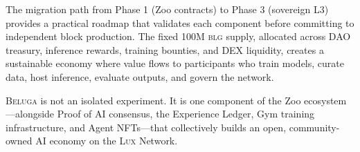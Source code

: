\documentclass[11pt,letterpaper]{article}
\newcommand{\Lux}{\textsc{Lux}}
\newcommand{\Beluga}{\textsc{Beluga}}
\newcommand{\BLG}{\textsc{blg}}
\begin{document}
The migration path from Phase 1 (Zoo contracts) to Phase 3 (sovereign L3) provides a practical roadmap that validates each component before committing to independent block production. The fixed 100M \BLG{} supply, allocated across DAO treasury, inference rewards, training bounties, and DEX liquidity, creates a sustainable economy where value flows to participants who train models, curate data, host inference, evaluate outputs, and govern the network.

\Beluga{} is not an isolated experiment. It is one component of the Zoo ecosystem---alongside Proof of AI consensus, the Experience Ledger, Gym training infrastructure, and Agent NFTs---that collectively builds an open, community-owned AI economy on the \Lux{} Network.

\end{document}
